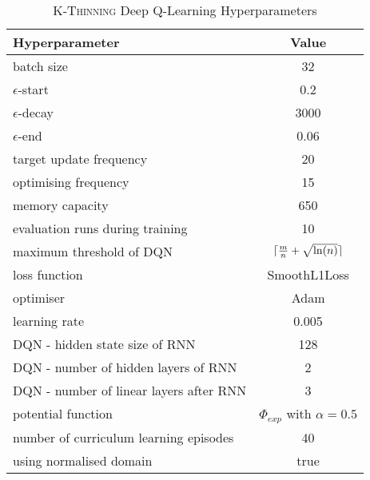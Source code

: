 \begin{table}[h!]\label{tab:k-thinning-hyperparameters}
\begin{threeparttable}
\caption{\textsc{K-Thinning} Deep Q-Learning Hyperparameters}
\centering
\begin{tabular}{l|c}
\toprule
Hyperparameter             &     Value \\
\midrule
batch size               &     32 \\ 
$\epsilon$-start               &    0.2 \\ 
$\epsilon$-decay         &     3000\\
$\epsilon$-end              &     0.06 \\
target update frequency               &     20 \\ 
optimising frequency          &     15 \\ 
memory capacity     &     650 \\
evaluation runs during training             &     10 \\
maximum threshold of DQN             &     $\lceil\frac{m}{n}+\sqrt{\ln(n)}\rceil$ \\ 
loss function               &     SmoothL1Loss \\ 
optimiser        &     Adam \\
learning rate             &     0.005 \\
DQN - hidden state size of RNN               &     128 \\ 
DQN - number of hidden layers of RNN         &     2 \\ 
DQN - number of linear layers after RNN     &     3 \\
potential function            &    $\Phi_{exp}$ with $\alpha=0.5$ \\
number of curriculum learning episodes            & 40 \\ 
using normalised domain               &     true \\ 
\bottomrule
\end{tabular}
\end{threeparttable}
\end{table}




